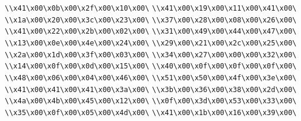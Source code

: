 \verb|\\x41\x00\x0b\x00\x2f\x00\x10\x00\|\newline
\verb|\\x41\x00\x19\x00\x11\x00\x41\x00\|\newline
\verb|\\x1a\x00\x20\x00\x3c\x00\x23\x00\|\newline
\verb|\\x37\x00\x28\x00\x08\x00\x26\x00\|\newline
\verb|\\x41\x00\x22\x00\x2b\x00\x02\x00\|\newline
\verb|\\x31\x00\x49\x00\x44\x00\x47\x00\|\newline
\verb|\\x13\x00\x0e\x00\x4e\x00\x24\x00\|\newline
\verb|\\x29\x00\x21\x00\x2c\x00\x25\x00\|\newline
\verb|\\x2a\x00\x1d\x00\x3f\x00\x03\x00\|\newline
\verb|\\x34\x00\x27\x00\x00\x00\x32\x00\|\newline
\verb|\\x14\x00\x0f\x00\x0d\x00\x15\x00\|\newline
\verb|\\x40\x00\x0f\x00\x0f\x00\x0f\x00\|\newline
\verb|\\x48\x00\x06\x00\x04\x00\x46\x00\|\newline
\verb|\\x51\x00\x50\x00\x4f\x00\x3e\x00\|\newline
\verb|\\x41\x00\x41\x00\x41\x00\x3a\x00\|\newline
\verb|\\x3b\x00\x36\x00\x38\x00\x2d\x00\|\newline
\verb|\\x4a\x00\x4b\x00\x45\x00\x12\x00\|\newline
\verb|\\x0f\x00\x3d\x00\x53\x00\x33\x00\|\newline
\verb|\\x35\x00\x0f\x00\x05\x00\x4d\x00\|\newline
\verb|\\x41\x00\x1b\x00\x16\x00\x39\x00\|\newline
